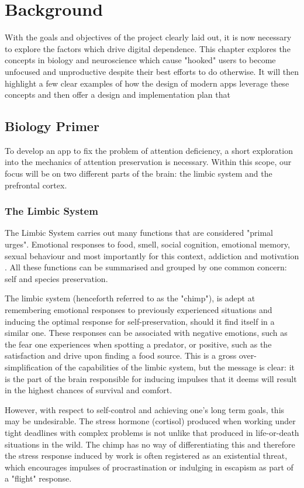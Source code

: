 \chapter{Background}
\label{ch:background}
With the goals and objectives of the project clearly laid out, it is now necessary to explore the factors which drive digital dependence. This chapter explores the concepts in biology and neuroscience which cause "hooked" users to become unfocused and unproductive despite their best efforts to do otherwise. It will then highlight a few clear examples of how the design of modern apps leverage these concepts and then offer a design and implementation plan that

\section{Biology Primer}
To develop an app to fix the problem of attention deficiency, a short exploration into the mechanics of attention preservation is necessary.
Within this scope, our focus will be on two different parts of the brain: the limbic system and the prefrontal cortex.

\subsection{The Limbic System}
The Limbic System carries out many functions that are considered "primal urges". Emotional responses to food, smell, social cognition, emotional memory, sexual behaviour and most importantly for this context, addiction and motivation \cite{rajmohan2007limbic}. All these functions can be summarised and grouped by one common concern: self and species preservation.

The limbic system (henceforth referred to as the "chimp"), is adept at remembering emotional responses to previously experienced situations and inducing the optimal response for self-preservation, should it find itself in a similar one. These responses can be associated with negative emotions, such as the fear one experiences when spotting a predator, or positive, such as the satisfaction and drive upon finding a food source. This is a gross over-simplification of the capabilities of the limbic system, but the message is clear: it is the part of the brain responsible for inducing impulses that it deems will result in the highest chances of survival and comfort.

However, with respect to self-control and achieving one's long term goals, this may be undesirable. The stress hormone (cortisol) produced when working under tight deadlines with complex problems is not unlike that produced in life-or-death situations in the wild. The chimp has no way of differentiating this and therefore the stress response induced by work is often registered as an existential threat, which encourages impulses of procrastination or indulging in escapism as part of a "flight" response.

